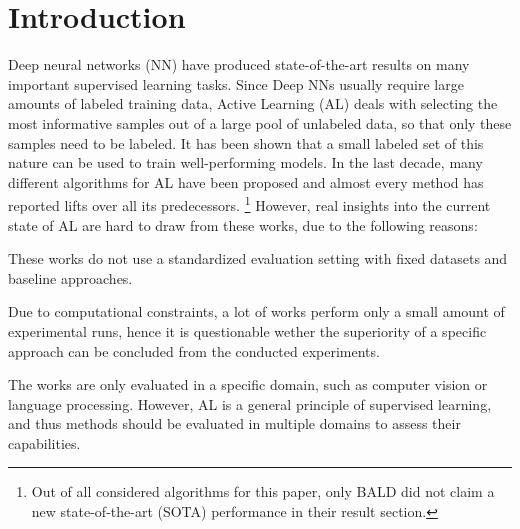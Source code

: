 \documentclass[]{article}
\begin{document}
\section{Introduction}\label{sec:introduction}
Deep neural networks (NN) have produced state-of-the-art results on many
important supervised learning tasks. Since Deep NNs usually require large
amounts of labeled training data, Active Learning (AL) deals with
selecting the most informative samples out of a large pool of unlabeled data, so
that only these samples need to be labeled. It has been shown that a small
labeled set of this nature can be used to train well-performing models.
In the last decade, many different algorithms for AL have been proposed and
almost every method has reported lifts over all its predecessors. \footnote{Out
of all considered algorithms for this paper, only BALD \cite{gal2017deep} did
not claim a new state-of-the-art (SOTA) performance in their result section.} However, real
insights into the current state of AL are hard to draw from these works, due to
the following reasons:
\begin{inparaenum}
\item\label{prob1al} These works do not use a standardized evaluation setting with fixed
datasets and baseline approaches.
\item Due to computational constraints, a lot of works perform only a small amount of experimental
runs, hence it is questionable wether the superiority of a specific approach can
be concluded from the conducted experiments.
\item The works are only evaluated in a specific domain, such as computer vision
or language processing. However, AL is a general principle of supervised
learning, and thus methods should be evaluated in multiple domains to assess
their capabilities.
\end{inparaenum}
\end{document}
